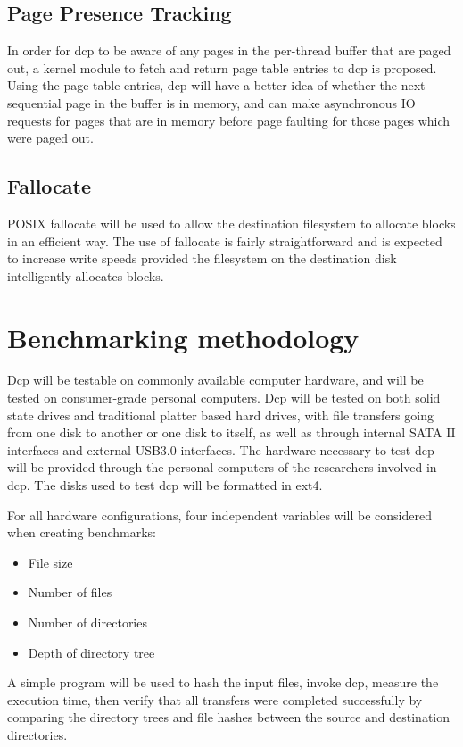 \documentclass[12pt]{article}
\begin{document}
\subsection{Page Presence Tracking}
In order for dcp to be aware of any pages in the per-thread buffer that
are paged out, a kernel module to fetch and return page table entries to
dcp is proposed. Using the page table entries, dcp will have a better
idea of whether the next sequential page in the buffer is in memory,
and can make asynchronous IO requests for pages that are in memory
before page faulting for those pages which were paged out.

\subsection{Fallocate}
POSIX fallocate will be used to allow the destination filesystem to
allocate blocks in an efficient way. The use of fallocate is
fairly straightforward and is expected to increase write speeds
provided the filesystem on the destination disk intelligently
allocates blocks.

\section{Benchmarking methodology}
Dcp will be testable on commonly available computer hardware, and will be tested on
consumer-grade personal computers. Dcp will be tested on both solid state drives
and traditional platter based hard drives, with file transfers going from one disk to
another or one disk to itself, as well as through internal SATA II interfaces and
external USB3.0 interfaces. The hardware necessary to test dcp will be provided through
the personal computers of the researchers involved in dcp. The disks used to test dcp
will be formatted in ext4.

For all hardware configurations, four independent variables will be considered when
creating benchmarks:
\begin{itemize}
    \item File size
    \item Number of files
    \item Number of directories
    \item Depth of directory tree
\end{itemize}

A simple program will be used to hash the input files, invoke dcp, measure the
execution time, then verify that all transfers were completed
successfully by comparing the directory trees and file hashes between
the source and destination directories.
\end{document}

